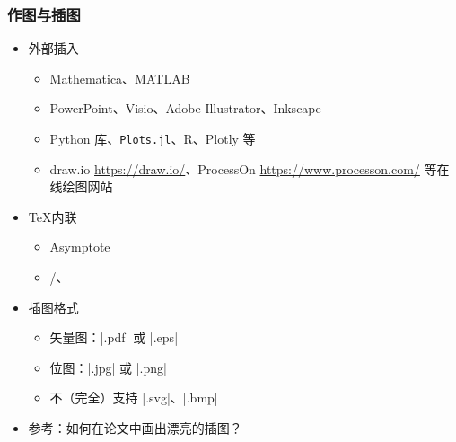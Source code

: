       \begin{frame}[fragile]
        \frametitle{作图与插图}
        \begin{itemize}
          \item 外部插入
      
            \begin{itemize}
              \item Mathematica、MATLAB
              \item PowerPoint、Visio、Adobe Illustrator、Inkscape
              \item Python  库、\texttt{Plots.jl}、R、Plotly 等
              \item draw.io \url{https://draw.io/}、ProcessOn \url{https://www.processon.com/} 等在线绘图网站
            \end{itemize}
      
          \item \TeX 内联
      
            \begin{itemize}
              \item Asymptote
              \item \alert{/、}
            \end{itemize}
      
          \item 插图格式
      
            \begin{itemize}
              \item 矢量图：|.pdf| 或 |.eps|
              \item 位图：|.jpg| 或 |.png|
              \item 不（完全）支持 |.svg|、|.bmp|
            \end{itemize}
      
          \item 参考：如何在论文中画出漂亮的插图？
        \end{itemize}
      \end{frame}
      
